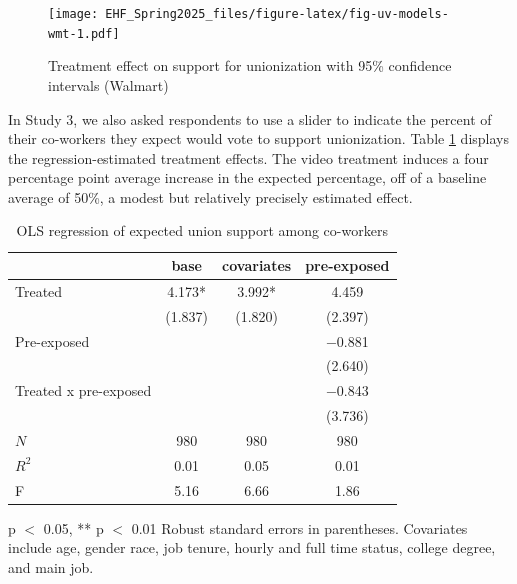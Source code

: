 \documentclass[
  11pt,
  oneside]{article}
\begin{document}
\begin{figure}
\centering
\texttt{[image: EHF\_Spring2025\_files/figure-latex/fig-uv-models-wmt-1.pdf]}
\caption{\label{fig:fig-uv-models-wmt}Treatment effect on support for unionization with 95\% confidence intervals (Walmart)}
\end{figure}

In Study 3, we also asked respondents to use a slider to indicate the percent of their co-workers they expect would vote to support unionization. Table \ref{tab:tab-usupp-models-wmt} displays the regression-estimated treatment effects. The video treatment induces a four percentage point average increase in the expected percentage, off of a baseline average of 50\%, a modest but relatively precisely estimated effect.

\begin{table}
\centering
\caption{\label{tab:tab-uv-models-wmt}OLS regression of expected union support among co-workers \label{tab:tab-usupp-models-wmt}}
\centering
\begin{threeparttable}
\begin{tabular}[t]{lccc}
\toprule
  & base & covariates & pre-exposed\\
\midrule
Treated & \num{4.173}* & \num{3.992}* & \num{4.459}\\
 & (\num{1.837}) & (\num{1.820}) & (\num{2.397})\\
Pre-exposed &  &  & \num{-0.881}\\
 &  &  & (\num{2.640})\\
Treated x pre-exposed &  &  & \num{-0.843}\\
 &  &  & (\num{3.736})\\
\midrule
$N$ & \num{980} & \num{980} & \num{980}\\
$R^2$ & \num{0.01} & \num{0.05} & \num{0.01}\\
F & \num{5.16} & \num{6.66} & \num{1.86}\\
\bottomrule
\end{tabular}
\begin{tablenotes}
\item * p $<$ 0.05, ** p $<$ 0.01 Robust standard errors in parentheses. Covariates include age, gender race, job tenure, hourly and full time status, college degree, and main job.
\end{tablenotes}
\end{threeparttable}
\end{table}
\end{document}
